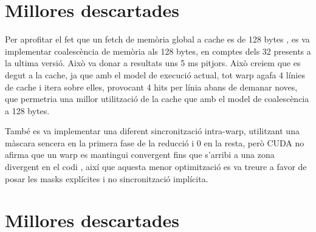 \documentclass[catalan,10pt,a4paper]{article}
\begin{document}
\newpage

\section*{Millores descartades}

Per aprofitar el fet que un fetch de memòria global a cache es de 128 bytes \cite{nvidiaDeveloperDoc}, es va implementar coalescència de memòria als 128 bytes, en comptes dels 32 presents a la ultima versió. Això va donar a resultats uns 5 ms pitjors. Això creiem que es degut a la cache, ja que amb el model de execució actual, tot warp agafa 4 línies de cache i itera sobre elles, provocant 4 hits per línia abans de demanar noves, que permetria una millor utilització de la cache que amb el model de coalescència a 128 bytes.

També es va implementar una diferent sincronització intra-warp, utilitzant una màscara sencera en la primera fase de la reducció i 0 en la resta, però CUDA no afirma que un warp es mantingui convergent fins que s'arribi a una zona divergent en el codi \cite{warpPrimitives}, així que aquesta menor optimització es va treure a favor de posar les masks explícites i no sincronització implícita.

\newpage

\section*{Millores descartades}

\newpage


\end{document}
